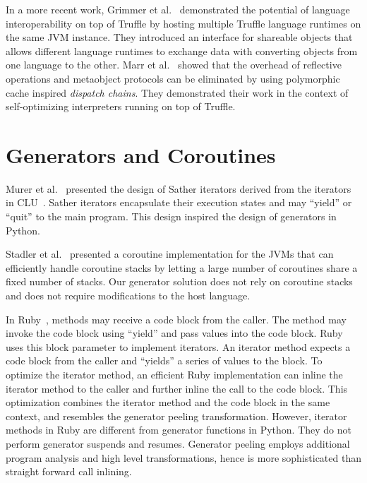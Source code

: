 In a more recent work, Grimmer et al.~\cite{grimmer2015dynamically, Grimmer+2014interoperability} demonstrated the potential of language interoperability on top of Truffle by hosting multiple Truffle language runtimes on the same JVM instance.
They introduced an interface for shareable objects that allows different language runtimes to exchange data with converting objects from one language to the other.
Marr et al.~\cite{marrzero} showed that the overhead of reflective operations and metaobject protocols can be eliminated by using polymorphic cache inspired \emph{dispatch chains}.
They demonstrated their work in the context of self-optimizing interpreters running on top of Truffle.

\section{Generators and Coroutines}

Murer et al.~\cite{Murer1996} presented the design of Sather iterators derived from the iterators in CLU~\cite{Liskov1977}.
Sather iterators encapsulate their execution states and may ``yield'' or ``quit'' to the main program.
This design inspired the design of generators in Python.

Stadler et al.~\cite{Stadler2010} presented a coroutine implementation for the JVMs that can efficiently handle coroutine stacks by letting a large number of coroutines share a fixed number of stacks.
Our generator solution does not rely on coroutine stacks and does not require modifications to the host language.

In Ruby~\cite{ruby}, methods may receive a code block from the caller.
The method may invoke the code block using ``yield'' and pass values into the code block.
Ruby uses this block parameter to implement iterators.
An iterator method expects a code block from the caller and ``yields'' a series of values to the block.
To optimize the iterator method, an efficient Ruby implementation can inline the iterator method to the caller and further inline the call to the code block.
This optimization combines the iterator method and the code block in the same context, and resembles the generator peeling transformation.
However, iterator methods in Ruby are different from generator functions in Python.
They do not perform generator suspends and resumes.
Generator peeling employs additional program analysis and high level transformations, hence is more sophisticated than straight forward call inlining.

